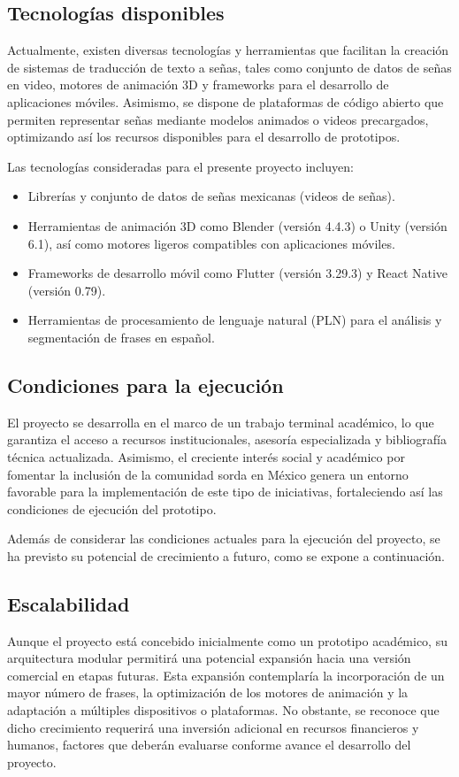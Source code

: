 \subsection{Tecnologías disponibles}
Actualmente, existen diversas tecnologías y herramientas que facilitan la creación de sistemas de traducción de texto a señas, tales como conjunto de datos de señas en video, motores de animación 3D y frameworks para el desarrollo de aplicaciones móviles. Asimismo, se dispone de plataformas de código abierto que permiten representar señas mediante modelos animados o videos precargados, optimizando así los recursos disponibles para el desarrollo de prototipos.

Las tecnologías consideradas para el presente proyecto incluyen:
\begin{itemize} 
	\item Librerías y conjunto de datos de señas mexicanas (videos de señas). 
	\item Herramientas de animación 3D como Blender (versión 4.4.3) o Unity (versión 6.1), así como motores ligeros compatibles con aplicaciones móviles. 
	\item Frameworks de desarrollo móvil como Flutter (versión 3.29.3) y React Native (versión 0.79). 
	\item Herramientas de procesamiento de lenguaje natural (PLN) para el análisis y segmentación de frases en español. 
\end{itemize}

\subsection{Condiciones para la ejecución}
El proyecto se desarrolla en el marco de un trabajo terminal académico, lo que garantiza el acceso a recursos institucionales, asesoría especializada y bibliografía técnica actualizada. Asimismo, el creciente interés social y académico por fomentar la inclusión de la comunidad sorda en México genera un entorno favorable para la implementación de este tipo de iniciativas, fortaleciendo así las condiciones de ejecución del prototipo.

Además de considerar las condiciones actuales para la ejecución del proyecto, se ha previsto su potencial de crecimiento a futuro, como se expone a continuación.

\subsection{Escalabilidad}
Aunque el proyecto está concebido inicialmente como un prototipo académico, su arquitectura modular permitirá una potencial expansión hacia una versión comercial en etapas futuras. Esta expansión contemplaría la incorporación de un mayor número de frases, la optimización de los motores de animación y la adaptación a múltiples dispositivos o plataformas. No obstante, se reconoce que dicho crecimiento requerirá una inversión adicional en recursos financieros y humanos, factores que deberán evaluarse conforme avance el desarrollo del proyecto.

